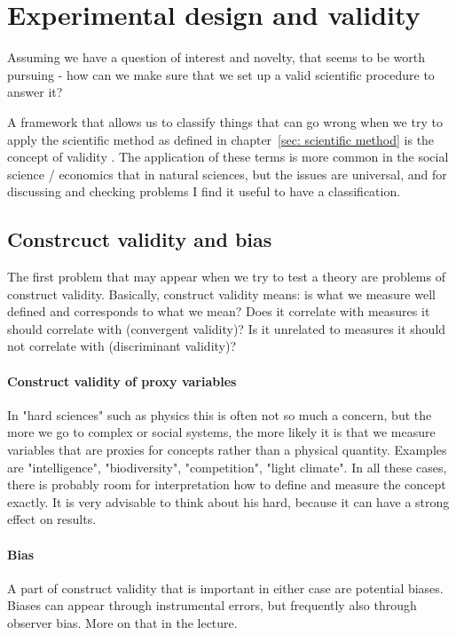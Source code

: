 \documentclass{tufte-book}
\begin{document}
\section{Experimental design and validity}

Assuming we have a question of interest and novelty, that seems to be worth pursuing - how can we make sure that we set up a valid scientific procedure to answer it?


A framework that allows us to classify things that can go wrong when we try to apply the scientific method as defined in chapter~\ref{sec: scientific method} is the concept of validity \citep[][]{Shadish-Experimentalandquasi-2002}. The application of these terms is more common in the social science / economics that in natural sciences, but the issues are universal, and for discussing and checking problems I find it useful to have a classification. 

\subsection{Constrcuct validity and bias}

The first problem that may appear when we try to test a theory are problems of construct validity. Basically, construct validity means: is what we measure well defined and corresponds to what we mean? Does it correlate with measures it should correlate with (convergent validity)? Is it unrelated to measures it should not correlate with (discriminant validity)?

\paragraph{Construct validity of proxy variables} In "hard sciences" such as physics this is often not so much a concern, but the more we go to complex or social systems, the more likely it is that we measure variables that are proxies for concepts rather than a physical quantity. Examples are "intelligence", "biodiversity", "competition", "light climate". In all these cases, there is probably room for interpretation how to define and measure the concept exactly. It is very advisable to think about his hard, because it can have a strong effect on results. 

\paragraph{Bias} A part of construct validity that is important in either case are potential biases. Biases can appear through instrumental errors, but frequently also through observer bias. More on that in the lecture. 
\end{document}
